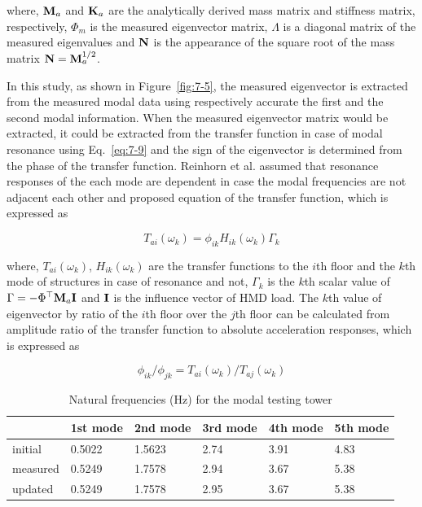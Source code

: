 where, $\mathbf{M}_{a}$ and $\mathbf{K}_{a}$ are the analytically derived mass matrix and stiffness matrix, respectively, $\Phi_{m}$ is the measured eigenvector matrix, $\Lambda$ is a diagonal matrix of the measured eigenvalues and $\mathbf{N}$ is the appearance of the square root of the mass matrix $\mathbf{N} = \mathbf{M}_{a}^{1/2}$.

In this study, as shown in Figure~\ref{fig:7-5}, the measured eigenvector is extracted from the measured modal data using respectively accurate the first and the second modal information. When the measured eigenvector matrix would be extracted, it could be extracted from the transfer function in case of modal resonance using Eq.~\eqref{eq:7-9} and the sign of the eigenvector is determined from the phase of the transfer function. Reinhorn et al. assumed that resonance responses of the each mode are dependent in case the modal frequencies are not adjacent each other and proposed equation of the transfer function, which is expressed as

\begin{equation} \label{eq:7-9}
T_{ai}\left(\omega_{k}\right) = \phi_{ik}H_{ik}\left(\omega_{k}\right)\Gamma_{k}
\end{equation}

where, $T_{ai}\left(\omega_{k}\right)$, $H_{ik}\left(\omega_{k}\right)$ are the transfer functions to the $i$th floor and the $k$th mode of structures in case of resonance and not, $\Gamma_{k}$ is the $k$th scalar value of $\Gamma = -\Phi^{\top}\mathbf{M}_{a}\mathbf{I}$ and $\mathbf{I}$ is the influence vector of HMD load. The $k$th value of eigenvector by ratio of the $i$th floor over the $j$th floor can be calculated from amplitude ratio of the transfer function to absolute acceleration responses, which is expressed as

\begin{equation}\label{eq:7-10}
\phi_{ik}/\phi_{jk} = T_{ai}\left(\omega_{k}\right)/T_{aj}\left(\omega_{k}\right)
\end{equation}

\begin{table}[ht]
\centering
\begin{tabularx}{\textwidth}{@{}X|X|X|X|X|X@{}}
\toprule[1pt]\midrule[0.3pt]
& 1st mode & 2nd mode & 3rd mode & 4th mode & 5th mode\\ \midrule[0.3pt]
initial & 0.5022 & 1.5623 & 2.74 & 3.91 & 4.83\\
measured& 0.5249 & 1.7578 & 2.94 & 3.67 & 5.38\\
updated & 0.5249 & 1.7578 & 2.95 & 3.67 & 5.38\\
\bottomrule
\end{tabularx}
\caption{Natural frequencies (Hz) for the modal testing tower}
\label{tab:7-3}
\end{table}

